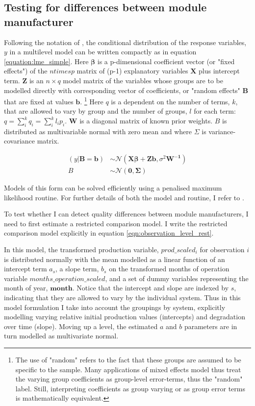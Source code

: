 \documentclass[12pt]{article}
\begin{document}
\subsection{Testing for differences between module manufacturer}
Following the notation of \citet{bates_fitting_2015}, the conditional distribution of the response variables, $y$ in a multilevel model can be written compactly as in equation \ref{equation:lme_simple}. Here $\mathbf{\beta}$ is a p-dimensional coefficient vector (or "fixed effects") of the $n times p$ matrix of (p-1) explanatory variables $\mathbf{X}$ plus intercept term. $\mathbf{Z}$ is an $n \times q$ model matrix of the variables whose groups are to be modelled directly with corresponding vector of coefficients, or "random effects" $\mathbf{B}$ that are fixed at values $\mathbf{b}$. \footnote{The use of "random" refers to the fact that these groups are assumed to be specific to the sample. Many applications of mixed effects model thus treat the varying group coefficients as group-level error-terms, thus the "random" label. Still, interpreting coefficients as group varying or as group error terms is mathematically equivalent.} Here $q$ is a dependent on the number of terms, $k$, that are allowed to vary by group and the number of groups, $l$ for each term: $q=\sum_i^k q_i = \sum_i^k l_i p_i$.  $\mathbf{W}$ is a diagonal matrix of known prior weights. $B$ is distributed as multivariable normal with zero mean and where $\Sigma$ is variance-covariance matrix.

\begin{align}
(y|\mathbf{B=b}) &\sim \mathcal{N}(\mathbf{X\beta + Zb}, \sigma^2\mathbf{W^{-1}})\\
B &\sim \mathcal{N}(\mathbf{0,\Sigma})
\label{equation:lme_simple}
\end{align}

Models of this form can be solved efficiently using a penalised maximum likelihood routine. For further details of both the model and routine, I refer to \citet{bates_fitting_2015}.

To test whether I can detect quality differences between module manufacturers, I need to first estimate a restricted comparison model. I write the restricted comparison model explicitly in equation \ref{eqn:observation_level_rest}.

In this model, the transformed production variable, $prod\_scaled_{i}$ for observation $i$ is distributed normally with the mean modelled as a linear function of an intercept term $a_s$, a slope term, $b_s$ on the transformed months of operation variable $months\_operation\_scaled$, and a set of dummy variables representing the month of year, $\mathbf{month}$. Notice that the intercept and slope are indexed by $s$, indicating that they are allowed to vary by the individual system. Thus in this model formulation I take into account the groupings by system, explicitly modelling varying relative initial production values (intercepts) and degradation over time (slope). Moving up a level, the estimated $a$ and $b$ parameters are in turn modelled as multivariate normal.
\end{document}
